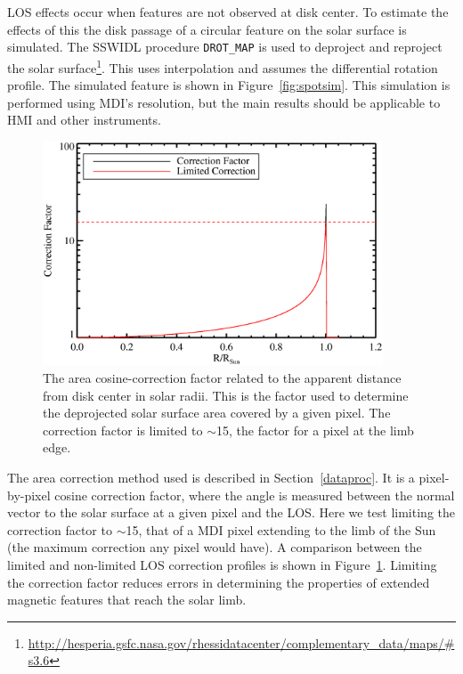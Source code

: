 \gls{LOS} effects occur when features are not observed at disk center. To estimate the effects of this the disk passage of a circular feature on the solar surface is simulated. The \gls{SSWIDL} procedure \verb!DROT_MAP! is used to deproject and reproject the solar surface\footnote{\url{http://hesperia.gsfc.nasa.gov/rhessidatacenter/complementary_data/maps/\#s3.6}}. This uses interpolation and assumes the \cite{Howard:1990} differential rotation profile. The simulated feature is shown in Figure~\ref{fig:spotsim}. This simulation is performed using MDI's resolution, but the main results should be applicable to HMI and other instruments.

\begin{figure}[!t]
\centerline{\includegraphics[width=0.9\textwidth,angle=0]{uncert/plot_correction_factor_2.eps}}
\caption[The pixel area LOS correction factor.]{The area cosine-correction factor related to the apparent distance from disk center in solar radii. This is the factor used to determine the deprojected solar surface area covered by a given pixel. The correction factor is limited to $\sim$15, the factor for a pixel at the limb edge.}
\label{fig:areacor}
\end{figure}

The area correction method used is described in Section~\ref{dataproc}. It is a pixel-by-pixel cosine correction factor, where the angle is measured between the normal vector to the solar surface at a given pixel and the \gls{LOS}.
Here we test limiting the correction factor to $\sim$15, that of a \gls{MDI} pixel extending to the limb of the Sun (the maximum correction any pixel would have). A comparison between the limited and non-limited \gls{LOS} correction profiles is shown in Figure~\ref{fig:areacor}. Limiting the correction factor reduces errors in determining the properties of extended magnetic features that reach the solar limb. 


